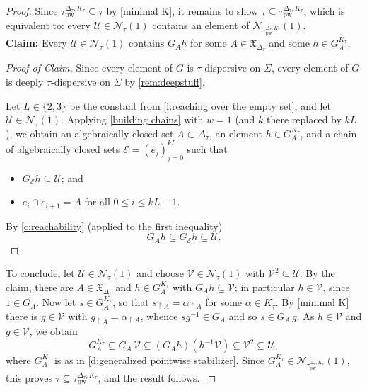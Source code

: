 \documentclass{article}
\theoremstyle{remark}
\theoremstyle{definition}
\newcommand{\U}[0]{\mathbb{U}}
\renewcommand{\U}[0]{\mathcal{U}}
\newcommand{\V}[0]{\mathcal{V}}
\newcommand{\pw}[0]{\tau_{\mathrm{pw}}}
\newcommand{\E}[0]{\mathcal{E}}
\newcommand{\X}[0]{\mathfrak{X}}
\newcommand*{\greysquare}{\textcolor{gray}{\blacksquare}}
\newenvironment{subproof}[1][\proofname]{%
\renewcommand{\qedsymbol}{$\greysquare$}%
\begin{proof}[#1]%
	}{%
\end{proof}%
}
\renewcommand\leq{\leqslant}
\begin{document}
{{{{{\begin{proof}
 
 Since $\pw^{\Delta_\tau, K_\tau} \subseteq \tau$ by \cref{minimal K}, it
  remains to show $\tau \subseteq \pw^{\Delta_\tau, K_\tau}$, which is
  equivalent to: every $\U \in \mathcal{N}_\tau(1)$ contains an element of
  $\mathcal{N}_{\pw^{\Delta_\tau, K_\tau}}(1)$.\\
  \textbf{Claim:} Every $\U\in\mathcal{N}_{\tau}(1)$ contains {$G_{A}h$ for some $A\in\X_{\Delta_{\tau}}$ and some $h\in G_{A}^{K_{\tau}}$}.
   \begin{subproof}[Proof of Claim]
   Since every element of $G$ is $\tau$-dispersive on $\Sigma$, every
    element of $G$ is deeply $\tau$-dispersive on $\Sigma$ {by \cref{rem:deepstuff}.}
    {Let $L\in\{2,3\}$ be the constant from \cref{l:reaching over the empty set}, and let $\U\in\mathcal{N}_{\tau}(1)$. Applying \cref{building chains}  with $w=1$ 
   {(and $k$ there replaced by $kL$)},  we obtain an algebraically closed set $A\subset \Delta_{\tau}$, an element {$h\in G_{A}^{K_{\tau}}$}, and a chain of algebraically closed sets $\mathcal{E}=(\overline{e}_{j})_{j=0}^{kL}$ such that 
   	 \begin{itemize}
   	 	\item $G_{\E}h\subseteq\U$; and 
   	 	\item $\overline{e}_{i}\cap \overline{e}_{i+1}=A$ for all $0\leq i\leq kL-1$. 
        	 \end{itemize}}

     
    
   
   By \cref{c:reachability} (applied to the first inequality) 
   \begin{equation*}
   	G_{A}h\subseteq G_{\mathcal{E}}h\subseteq\U.
   \end{equation*}
   \end{subproof}
{To conclude, let $\U\in\mathcal{N}_{\tau}(1)$ and choose $\V\in\mathcal{N}_{\tau}(1)$ with
$\V^{2}\subseteq\U$. By the claim, there are $A\in\X_{\Delta_{\tau}}$ and
$h\in G_{A}^{K_{\tau}}$ with $G_{A}h\subseteq\V$; in particular $h\in\V$, since
$1\in G_{A}$.
Now let $s\in G_{A}^{K_{\tau}}$, so that $s_{\restriction A}=\alpha_{\restriction A}$ for
some $\alpha\in K_{\tau}$. By \cref{minimal K} there is $g\in\V$ with
$g_{\restriction A}=\alpha_{\restriction A}$, whence $sg^{-1}\in G_{A}$ and so
$s\in G_{A}\,g$. As $h\in\V$ and $g\in\V$, we obtain}
\begin{equation*}
  G_{A}^{K_{\tau}}\subseteq G_{A}\,\V\subseteq (G_{A}h)(h^{-1}\V)\subseteq \V^2
    \subseteq\U ,
\end{equation*}
{where $G_{A}^{K_{\tau}}$ is as in \cref{d:generalized pointwise stabilizer}. Since
$G_{A}^{K_{\tau}}\in\mathcal{N}_{\pw^{\Delta_{\tau},K_{\tau}}}(1)$, this proves $\tau\subseteq\pw^{\Delta_{\tau},K_{\tau}}$, and the result follows.
}


\end{proof}}}}}}
\end{document}
